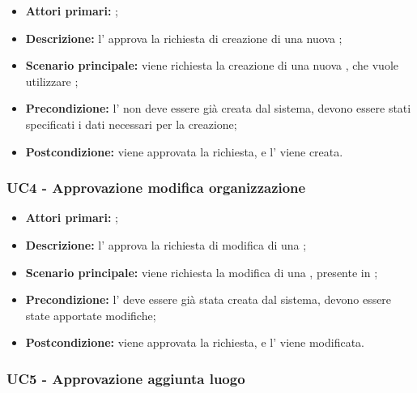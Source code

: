 \documentclass[../analisi-dei-requisiti]{subfiles}
\begin{document}
\begin{itemize}
\item \textbf{Attori primari:} ;
\item \textbf{Descrizione:} l' approva la richiesta di creazione di una nuova ;
\item \textbf{Scenario principale:} viene richiesta la creazione di una nuova , che vuole utilizzare ;
\item \textbf{Precondizione:} l' non deve essere già creata dal sistema, devono essere stati specificati i dati necessari per la creazione;
\item \textbf{Postcondizione:} viene approvata la richiesta, e l' viene creata.

\end{itemize}
\subsubsection{UC4 - Approvazione modifica organizzazione}
\label{subsub:UC4}

\begin{itemize}
\item \textbf{Attori primari:} ;
\item \textbf{Descrizione:} l' approva la richiesta di modifica di una ;
\item \textbf{Scenario principale:} viene richiesta la modifica di una , presente in ;
\item \textbf{Precondizione:} l' deve essere già stata creata dal sistema, devono essere state apportate modifiche;
\item \textbf{Postcondizione:} viene approvata la richiesta, e l' viene modificata.

\end{itemize}
\subsubsection{UC5 - Approvazione aggiunta luogo}
\label{subsub:UC5}
\end{document}
